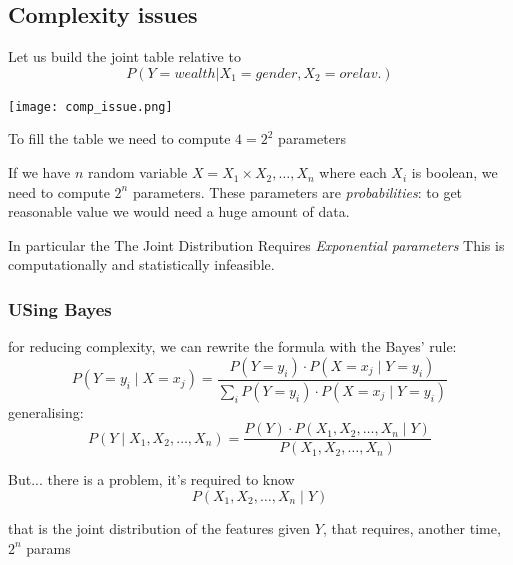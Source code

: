\subsection{Complexity issues}
Let us build the joint table relative to
\[
    P(Y = wealth|X_1 = gender , X_2 = orelav.)
\]

\begin{center}
    \texttt{[image: comp\_issue.png]}
\end{center}
To fill the table we need to compute $4=2^2$ parameters

If we have $n$ random variable $X = X_1 \times X_2 ,\dots, X_n$ where each $X_i$ is
boolean, we need to compute $2^n$ parameters. These parameters are \textit{probabilities}: to get reasonable value we would need a huge amount of data.

In particular the The Joint Distribution Requires \textit{Exponential parameters}
This is computationally and statistically infeasible.
\subsubsection{USing Bayes}
for reducing complexity, we can rewrite the formula with the Bayes' rule:
\[
    P(Y=y_i\mid X=x_j) = \frac{P(Y=y_i)\cdot P(X = x_j\mid Y = y_i)}{\sum_i P(Y=y_i)\cdot P(X=x_j \mid Y=y_i)}
\]
generalising:
\[
    P(Y \mid X_1, X_2, \dots, X_n) = \frac{P(Y) \cdot P(X_1, X_2, \dots, X_n \mid Y)}{P(X_1, X_2, \dots, X_n)}
\]

But... there is a problem, it's required to know 
\[
    P(X_1, X_2, \dots, X_n \mid Y)
\]

that is the joint distribution of the features given $Y$, that requires, another time, $2^n$ params

